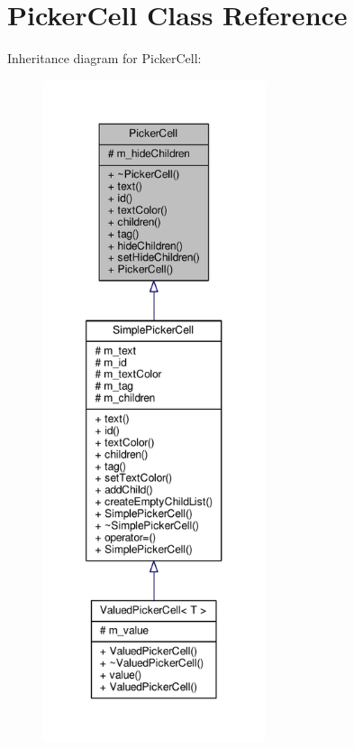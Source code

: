 \hypertarget{classPickerCell}{}\section{Picker\+Cell Class Reference}
\label{classPickerCell}


Inheritance diagram for Picker\+Cell\+:
\nopagebreak
\begin{figure}[H]
\begin{center}
\leavevmode
\includegraphics[height=550pt]{db/d32/classPickerCell__inherit__graph}
\end{center}
\end{figure}


